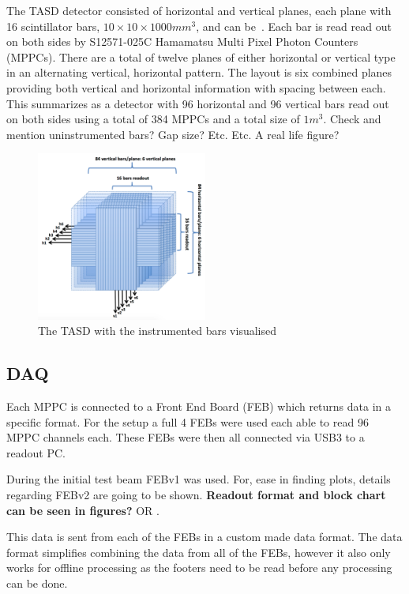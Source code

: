 The TASD detector consisted of horizontal and vertical planes, each plane with 16 scintillator bars, $10\times10\times1000 mm^3$, and can be~. Each bar is read read out on both sides by S12571-025C Hamamatsu Multi Pixel Photon Counters (MPPCs). There are a total of twelve planes of either horizontal or vertical type in an alternating vertical, horizontal pattern. The layout is six combined planes providing both vertical and horizontal information with spacing between each. This summarizes as a detector with 96 horizontal and 96 vertical bars read out on both sides using a total of 384 MPPCs and a total size of $1m^3$. Check and mention uninstrumented bars? Gap size? Etc. Etc. A real life figure?

\begin{figure}[h!]
\centering
\includegraphics[width=0.5\textwidth]{figures/AIDA.png}
\caption{The TASD with the instrumented bars visualised}
\label{fig:TASD}
\end{figure}

\subsection{DAQ}
Each MPPC is connected to a Front End Board (FEB) which returns data in a specific format. For the setup a full 4 FEBs were used each able to read 96 MPPC channels each. These FEBs were then all connected via USB3 to a readout PC. 

During the initial test beam FEBv1 was used. For, ease in finding plots, details regarding FEBv2 are going to be shown.
\textbf{Readout format and block chart can be seen in figures? }OR \cite{71Status17}.

This data is sent from each of the FEBs in a custom made data format. The data format simplifies combining the data from all of the FEBs, however it also 
only works for offline processing as the footers need to be read before any processing can be done.

